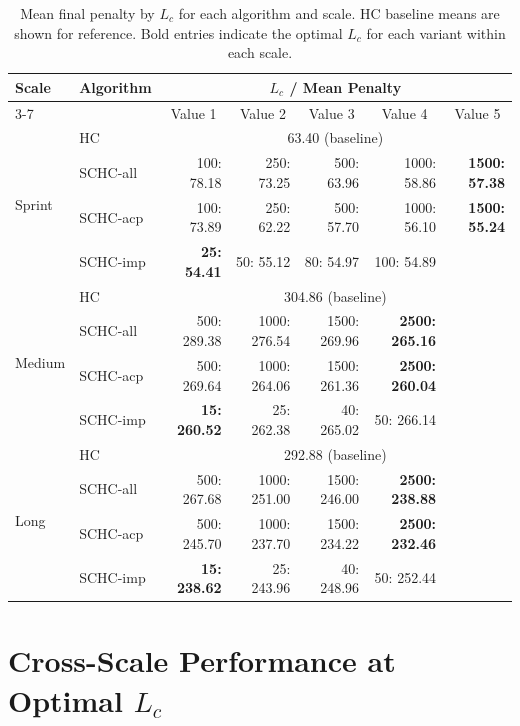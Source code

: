 \documentclass[12pt, a4paper, oneside]{report}
\begin{document}
\begin{table}[H]
\centering
\caption{Mean final penalty by $L_c$ for each algorithm and scale.
HC baseline means are shown for reference. Bold entries indicate
the optimal $L_c$ for each variant within each scale.}
\label{tab:lc_sweep}
\footnotesize
\setlength{\tabcolsep}{4pt}
\begin{tabular}{llrrrrr}
\toprule
Scale & Algorithm & \multicolumn{5}{c}{$L_c$ / Mean Penalty} \\
\cmidrule(lr){3-7}
 & & \multicolumn{1}{c}{Value 1} & \multicolumn{1}{c}{Value 2}
   & \multicolumn{1}{c}{Value 3} & \multicolumn{1}{c}{Value 4}
   & \multicolumn{1}{c}{Value 5} \\
\midrule
\multirow{4}{*}{Sprint}
  & HC       & \multicolumn{5}{c}{63.40 (baseline)} \\
  & SCHC-all & 100: 78.18 & 250: 73.25 & 500: 63.96 & 1000: 58.86 & \textbf{1500: 57.38} \\
  & SCHC-acp & 100: 73.89 & 250: 62.22 & 500: 57.70 & 1000: 56.10 & \textbf{1500: 55.24} \\
  & SCHC-imp & \textbf{25: 54.41} & 50: 55.12 & 80: 54.97 & 100: 54.89 & \\
\midrule
\multirow{4}{*}{Medium}
  & HC       & \multicolumn{5}{c}{304.86 (baseline)} \\
  & SCHC-all & 500: 289.38 & 1000: 276.54 & 1500: 269.96 & \textbf{2500: 265.16} & \\
  & SCHC-acp & 500: 269.64 & 1000: 264.06 & 1500: 261.36 & \textbf{2500: 260.04} & \\
  & SCHC-imp & \textbf{15: 260.52} & 25: 262.38 & 40: 265.02 & 50: 266.14 & \\
\midrule
\multirow{4}{*}{Long}
  & HC       & \multicolumn{5}{c}{292.88 (baseline)} \\
  & SCHC-all & 500: 267.68 & 1000: 251.00 & 1500: 246.00 & \textbf{2500: 238.88} & \\
  & SCHC-acp & 500: 245.70 & 1000: 237.70 & 1500: 234.22 & \textbf{2500: 232.46} & \\
  & SCHC-imp & \textbf{15: 238.62} & 25: 243.96 & 40: 248.96 & 50: 252.44 & \\
\bottomrule
\end{tabular}
\end{table}

\newpage
\section{Cross-Scale Performance at Optimal \texorpdfstring{$L_c$}{Lc}}
\label{sec:cross_scale}
\end{document}
